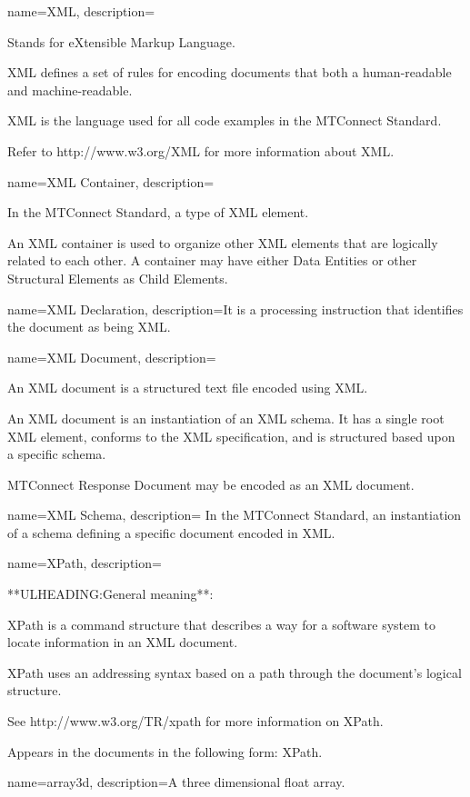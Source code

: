 {
    name={XML},
	description={
	Stands for eXtensible Markup Language. 

	XML defines a set of rules for encoding documents that both a human-readable and machine-readable.

	XML is the language used for all code examples in the MTConnect Standard.

	Refer to http://www.w3.org/XML for more information about XML.
}
}

{
    name={XML Container},
	description={
	In the MTConnect Standard, a type of XML element.

	An XML container is used to organize other XML elements that are logically related to each other.   A container may have either \gls{Data Entities} or other \gls{Structural Elements} as \gls{Child Elements}.
}
}

{
    name={XML Declaration},
	description={It is a processing instruction that identifies the document as being XML.}
}

{
    name={XML Document},
	description={
	An XML document is a structured text file encoded using XML.

	An XML document is an instantiation of an XML schema.  It has a single root XML element, conforms to the XML specification, and is structured based upon a specific schema.

	\gls{MTConnect Response Document} may be encoded as an XML document.
}
}

{
    name={XML Schema},
	description={
	In the MTConnect Standard, an instantiation of a schema defining a specific document encoded in XML.
}
}

{
    name={XPath},
	description={
	**ULHEADING:General meaning**:

	\gls{XPath} is a command structure that describes a way for a software system to locate information in an XML document.  

	\gls{XPath} uses an addressing syntax based on a path through the document's logical structure. 

	See http://www.w3.org/TR/xpath for more information on \gls{XPath}.

	Appears in the documents in the following form: \gls{XPath}.
}
}

{
    name={array3d},
	description={A three dimensional \gls{float} array.}
}

